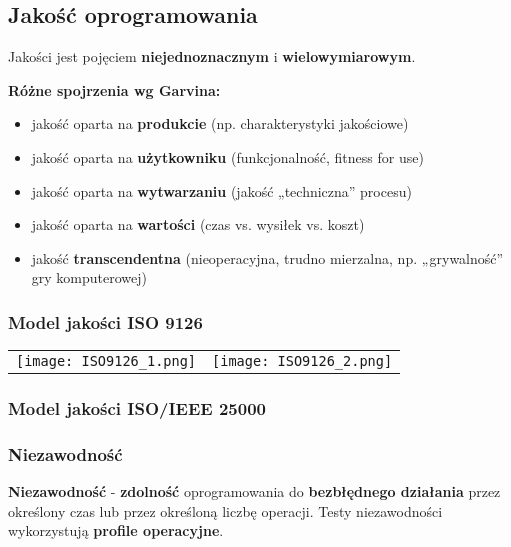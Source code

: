 \documentclass[../main.tex]{subfiles}
\begin{document}
    \subsection{Jakość oprogramowania}
    Jakości jest pojęciem \textbf{niejednoznacznym} i \textbf{wielowymiarowym}.

    \textbf{Różne spojrzenia wg Garvina:}
    \begin{itemize}
        \item jakość oparta na \textbf{produkcie} (np. charakterystyki jakościowe)
        \item jakość oparta na \textbf{użytkowniku} (funkcjonalność, fitness for use)
        \item jakość oparta na \textbf{wytwarzaniu} (jakość „techniczna” procesu)
        \item jakość oparta na \textbf{wartości} (czas vs. wysiłek vs. koszt)
        \item jakość \textbf{transcendentna} (nieoperacyjna, trudno mierzalna, np. „grywalność” gry komputerowej)
    \end{itemize}


    \subsubsection{Model jakości ISO 9126}

    \begin{table}[H]
        \begin{center}
            \begin{tabular}{ p{8cm} p{8cm}}
                \texttt{[image: ISO9126\_1.png]}
                &
                \texttt{[image: ISO9126\_2.png]}
            \end{tabular}
        \end{center}
    \end{table}


    \subsubsection{Model jakości ISO/IEEE 25000}

    \subsubsection{Niezawodność}

    \textbf{Niezawodność} - \textbf{zdolność} oprogramowania do \textbf{bezbłędnego działania} przez określony czas lub przez określoną
    liczbę operacji. Testy niezawodności wykorzystują \textbf{profile operacyjne}.
\end{document}
